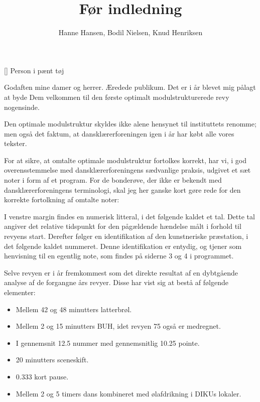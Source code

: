 \documentclass[a4paper,11pt]{article}
\title{Før indledning}
\author{Hanne Hansen, Bodil Nielsen, Knud Henriksen}
\begin{document}
\maketitle

\begin{roles}
[] Person i pænt tøj
\end{roles}



\begin{sketch}


 Godaften mine damer og herrer. Æredede publikum. Det er i år blevet mig pålagt at byde Dem velkommen til den første optimalt modulstrukturerede revy nogensinde.

 Den optimale modulstruktur skyldes ikke alene hensynet til instituttets renomme; men også det faktum, at dansklærerforeningen igen i år har købt alle vores tekster.

 For at sikre, at omtalte optimale modulstruktur fortolkes korrekt, har vi, i god overensstemmelse med dansklærerforeningens sædvanlige praksis, udgivet et sæt noter i form af et program. For de bonderøve, der ikke er bekendt med dansklærerforeningens terminologi, skal jeg her ganske kort gøre rede for den korrekte fortolkning af omtalte noter:

 I venstre margin findes en numerisk litteral, i det følgende kaldet et tal. Dette tal angiver det relative tidspunkt for den pågældende hændelse målt i forhold til revyens start. Derefter følger en identifikation af den kunstneriske præstation, i det følgende kaldet nummeret. Denne identifikation er entydig, og tjener som henvisning til en egentlig note, som findes på siderne 3 og 4 i programmet.

 Selve revyen er i år fremkommest som det direkte resultat af en dybtgående analyse af de forgangne års revyer. Disse har vist sig at bestå af følgende elementer:


\begin{itemize}
    \item Mellem 42 og 48 minutters latterbrøl.
    \item Mellem 2 og 15 minutters BUH, idet revyen 75 også er medregnet.
    \item I gennemsnit 12.5 nummer med gennemsnitlig 10.25 pointe.
    \item 20 minutters sceneskift.
    \item 0.333 kort pause.
    \item Mellem 2 og 5 timers dans kombineret med ølafdrikning i DIKUs lokaler.
\end{itemize}


\end{sketch}
\end{document}
